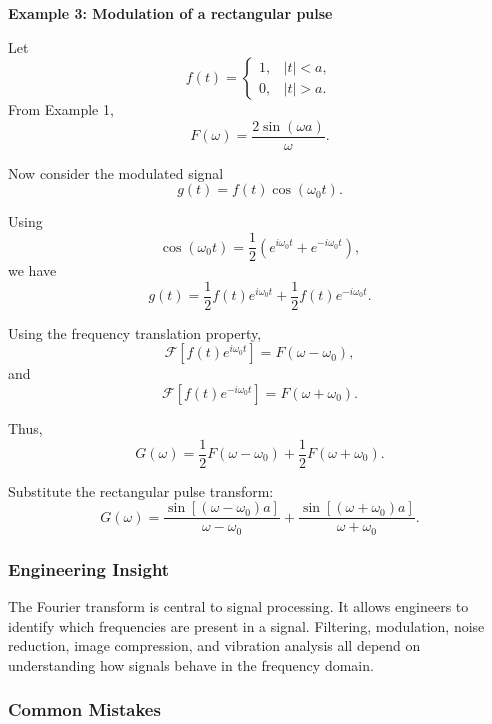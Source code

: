 \begin{examplebox}
    \textbf{Example 3: Modulation of a rectangular pulse}

    Let
    \[
        f(t)=
        \begin{cases}
            1, & |t|<a, \\
            0, & |t|>a.
        \end{cases}
    \]
    From Example 1,
    \[
        F(\omega)=\frac{2\sin(\omega a)}{\omega}.
    \]

    Now consider the modulated signal
    \[
        g(t)=f(t)\cos(\omega_0t).
    \]

    Using
    \[
        \cos(\omega_0t)=\frac{1}{2}
        \left(e^{i\omega_0t}+e^{-i\omega_0t}\right),
    \]
    we have
    \[
        g(t)
        =
        \frac{1}{2}f(t)e^{i\omega_0t}
        +
        \frac{1}{2}f(t)e^{-i\omega_0t}.
    \]

    Using the frequency translation property,
    \[
        \mathcal{F}[f(t)e^{i\omega_0t}]
        =
        F(\omega-\omega_0),
    \]
    and
    \[
        \mathcal{F}[f(t)e^{-i\omega_0t}]
        =
        F(\omega+\omega_0).
    \]

    Thus,
    \[
        G(\omega)
        =
        \frac{1}{2}F(\omega-\omega_0)
        +
        \frac{1}{2}F(\omega+\omega_0).
    \]

    Substitute the rectangular pulse transform:
    \[
        G(\omega)
        =
        \frac{\sin[(\omega-\omega_0)a]}{\omega-\omega_0}
        +
        \frac{\sin[(\omega+\omega_0)a]}{\omega+\omega_0}.
    \]
\end{examplebox}

\subsubsection*{Engineering Insight}

\begin{noteBox}
    The Fourier transform is central to signal processing. It allows engineers to identify which frequencies are present in a signal. Filtering, modulation, noise reduction, image compression, and vibration analysis all depend on understanding how signals behave in the frequency domain.
\end{noteBox}

\subsubsection*{Common Mistakes}


